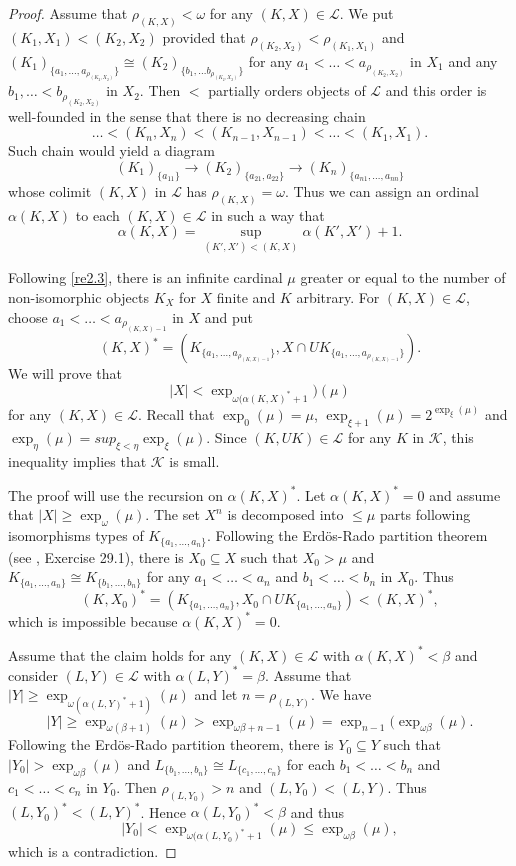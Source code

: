 \documentclass[12pt]{amsart}
\newcommand\ck{\mathcal {K}}
\newcommand\cl{\mathcal {L}}
\begin{document}
\begin{proof}
Assume that $\rho_{(K,X)}<\omega$ for any $(K,X)\in\cl$. We put $(K_1,X_1)<(K_2,X_2)$ provided that $\rho_{(K_2,X_2)}<\rho_{(K_1,X_1)}$ and
$(K_1)_{\{a_1,\dots,a_{\rho_{(K_2,X_2)}}\}}\cong (K_2)_{\{b_1,\dots b_{\rho_{(K_2,X_2)}}\}}$ for any $a_1< \dots < a_{\rho_{(K_2,X_2)}}$ in $X_1$
and any $b_1,\dots <b_{\rho_{(K_2,X_2)}}$ in $X_2$. Then $<$ partially orders objects of $\cl$ and this order is well-founded in the sense
that there is no decreasing chain
$$
\dots <(K_n,X_n) < (K_{n-1},X_{n-1}) <\dots < (K_1,X_1).
$$
Such chain would yield a diagram
$$
(K_1)_{\{a_{11}\}}\to (K_2)_{\{a_{21},a_{22}\}}\to (K_n)_{\{a_{n1},\dots,a_{nn}\}}
$$
whose colimit $(K,X)$ in $\cl$ has $\rho_{(K,X)}=\omega$. Thus we can assign an ordinal $\alpha(K,X)$ to each $(K,X)\in\cl$ in such a way
that 
$$
\alpha(K,X)=\sup_{(K',X')<(K,X)}\alpha(K',X')+1.
$$

Following \ref{re2.3}, there is an infinite cardinal $\mu$ greater or equal to the number of non-isomorphic objects $K_X$ for $X$ finite
and $K$ arbitrary. For $(K,X)\in\cl$, choose $a_1<\dots <a_{\rho_{(K,X)-1}}$ in $X$ and put
$$
(K,X)^\ast= (K_{\{a_1,\dots,a_{\rho_{(K,X)-1}}\}},X\cap UK_{\{a_1,\dots,a_{\rho_{(K,X)-1}}\}}).
$$
We will prove that 
$$
|X|<\exp_{\omega(\alpha(K,X)^\ast+1})(\mu) 
$$
for any $(K,X)\in\cl$. Recall that $\exp_0(\mu)=\mu$, $\exp_{\xi+1}(\mu)=2^{\exp_\xi(\mu)}$ and $\exp_\eta(\mu)=sup_{\xi<\eta}\exp_\xi(\mu)$.
Since $(K,UK)\in\cl$ for any $K$ in $\ck$, this inequality implies that $\ck$ is small.

The proof will use the recursion on $\alpha(K,X)^\ast$.
Let $\alpha(K,X)^\ast=0$ and assume that $|X|\geq\exp_\omega(\mu)$.  The set $X^n$ is decomposed into $\leq\mu$ parts following isomorphisms types
of $K_{\{a_1,\dots,a_n\}}$. Following the Erd\"os-Rado partition theorem (see \cite{J}, Exercise 29.1), there is $X_0\subseteq X$ such that $X_0>\mu$
and $K_{\{a_1,\dots,a_n\}}\cong K_{\{b_1,\dots,b_n\}}$ for any $a_1<\dots<a_n$ and $b_1<\dots<b_n$ in $X_0$. Thus 
$$\label{claim}
(K,X_0)^\ast=(K_{\{a_1,\dots,a_n\}},X_0\cap UK_{\{a_1,\dots,a_n\}})<(K,X)^\ast,
$$
which is impossible because $\alpha(K,X)^\ast=0$.

Assume that the claim holds for any $(K,X)\in\cl$ with $\alpha(K,X)^\ast<\beta$ and consider $(L,Y)\in\cl$ with $\alpha(L,Y)^\ast=\beta$. Assume that
$|Y|\geq\exp_{\omega(\alpha(L,Y)^\ast+1)}(\mu)$ and let $n=\rho_{(L,Y)}$. We have
$$
|Y|\geq\exp_{\omega(\beta+1)}(\mu)>\exp_{\omega\beta+n-1}(\mu)=\exp_{n-1}(\exp_{\omega\beta}(\mu).
$$
Following the Erd\"os-Rado partition theorem, there is $Y_0\subseteq Y$ such that $|Y_0|>\exp_{\omega\beta}(\mu)$ and 
$L_{\{b_1,\dots,b_n\}}\cong L_{\{c_1,\dots,c_n\}}$ for each $b_1<\dots <b_n$ and $c_1<\dots <c_n$ in $Y_0$. Then $\rho_{(L,Y_0)}> n$ and
$(L,Y_0)<(L,Y)$. Thus $(L,Y_0)^\ast < (L,Y)^\ast$. Hence $\alpha(L,Y_0)^\ast<\beta$ and thus
$$
|Y_0|<\exp_{\omega(\alpha(L,Y_0)^\ast+1}(\mu)\leq\exp_{\omega\beta}(\mu),
$$
which is a contradiction.
\end{proof}
\end{document}

